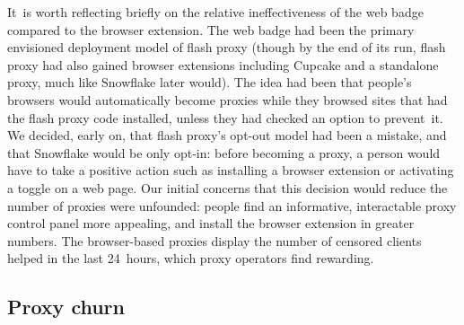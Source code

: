 \documentclass[letterpaper,twocolumn]{article}
\begin{document}

It~is worth reflecting briefly
on the relative ineffectiveness of the web badge
compared to the browser extension.
The web badge had been the primary envisioned deployment model of flash proxy
(though by the end of its run, flash proxy had also gained
browser extensions including Cupcake
and a standalone proxy,
much like Snowflake later would).
The idea had been that people's browsers
would automatically become proxies
while they browsed sites that had the flash proxy code installed,
unless they had checked an option to prevent~it.
We decided, early on, that flash proxy's opt-out model had been a mistake,
%
and that Snowflake would be only opt-in:
before becoming a proxy, a person would have to take a positive action
such as installing a browser extension
or activating a toggle on a web page.
Our initial concerns that this decision
would reduce the number of proxies were unfounded:
people find an informative, interactable proxy control panel more appealing,
and install the browser extension in greater numbers.
The browser-based proxies display the number of censored clients
helped in the last 24~hours,
which proxy operators find rewarding.

\subsection{Proxy churn}
\label{sec:proxy-churn}
\end{document}
